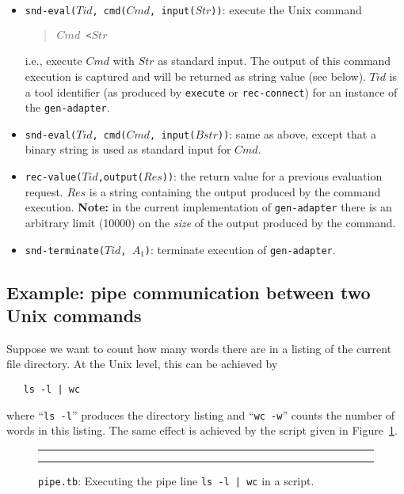 \begin{itemize}
\item {\tt snd-eval($Tid$, cmd($Cmd$, input($Str$))}: execute the Unix command
\begin{quote}
	{\tt $Cmd$ <$Str$}
\end{quote}
i.e., execute $Cmd$ with $Str$ as standard input. The output of this command execution
is captured and will be returned as string value (see below).
$Tid$ is a tool identifier 
(as produced by {\tt execute} or {\tt rec-connect}) for an instance of the {\tt gen-adapter}.

\item {\tt snd-eval($Tid$, cmd($Cmd$, input($Bstr$))}: same as above, except that
a binary string is used as standard input for $Cmd$.

\item {\tt rec-value($Tid$,output($Res$))}: the return value for a previous evaluation request.
$Res$ is a string containing the output produced by the command execution.
{\bf Note:} in the current implementation of {\tt gen-adapter} there is an arbitrary
limit (10000) on the {\em size} of the output produced by the command.
\item {\tt snd-terminate($Tid$, $A_1$)}: terminate execution of {\tt gen-adapter}.
\end{itemize}

\subsection{\label{Ex-pipe}Example: pipe communication between two Unix commands}
Suppose we want to count how many words there are in a listing of the
current file directory. At the Unix level, this can be achieved by
\begin{verbatim}
   ls -l | wc
\end{verbatim}
where ``{\tt ls -l}'' produces the directory listing and
``{\tt wc -w}'' counts the number of words in this listing.
The same effect is achieved by the script given in Figure~\ref{fig:pipe.tb}.

\begin{figure}
\rule{\textwidth}{0.5mm}

  \caption{{\tt pipe.tb}: Executing the pipe line {\tt ls -l | wc} in a script.}
  \label{fig:pipe.tb}
\rule{\textwidth}{0.5mm}
\end{figure}
